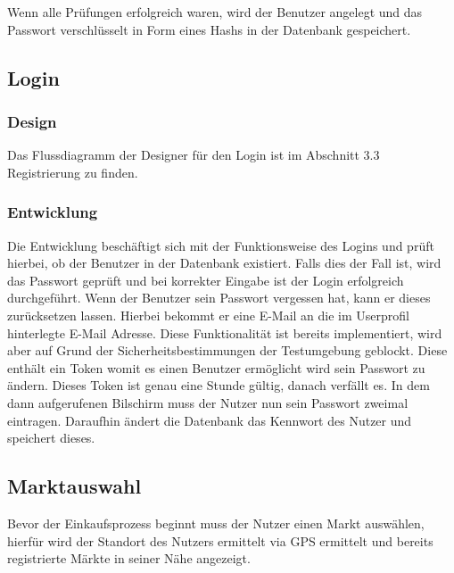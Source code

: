 \documentclass[12pt,a4paper]{article}
\begin{document}
Wenn alle Prüfungen erfolgreich waren, wird der Benutzer angelegt und das Passwort verschlüsselt in Form eines Hashs in der Datenbank gespeichert.
\newpage
\subsection{Login}
\subsubsection*{Design}
Das Flussdiagramm der Designer für den Login ist im Abschnitt 3.3 Registrierung zu finden. 
\subsubsection*{Entwicklung}
Die Entwicklung beschäftigt sich mit der Funktionsweise des Logins und prüft hierbei, ob der Benutzer in der Datenbank existiert. Falls dies der Fall ist, wird das Passwort geprüft und bei korrekter Eingabe ist der Login erfolgreich durchgeführt.
Wenn der Benutzer sein Passwort vergessen hat, kann er dieses zurücksetzen lassen. Hierbei bekommt er eine E-Mail an die im Userprofil hinterlegte E-Mail Adresse. Diese Funktionalität ist bereits implementiert, wird aber auf Grund der Sicherheitsbestimmungen der Testumgebung geblockt. Diese enthält ein Token womit es einen Benutzer ermöglicht wird sein Passwort zu ändern. Dieses Token ist genau eine Stunde gültig, danach verfällt es. 
In dem dann aufgerufenen Bilschirm muss der Nutzer nun sein Passwort zweimal eintragen. Daraufhin ändert die Datenbank das Kennwort des Nutzer und speichert dieses.
\newpage
\subsection{Marktauswahl}
Bevor der Einkaufsprozess beginnt muss der Nutzer einen Markt auswählen, hierfür wird der Standort des Nutzers ermittelt via GPS ermittelt und bereits registrierte Märkte in seiner Nähe angezeigt. 
\end{document}
